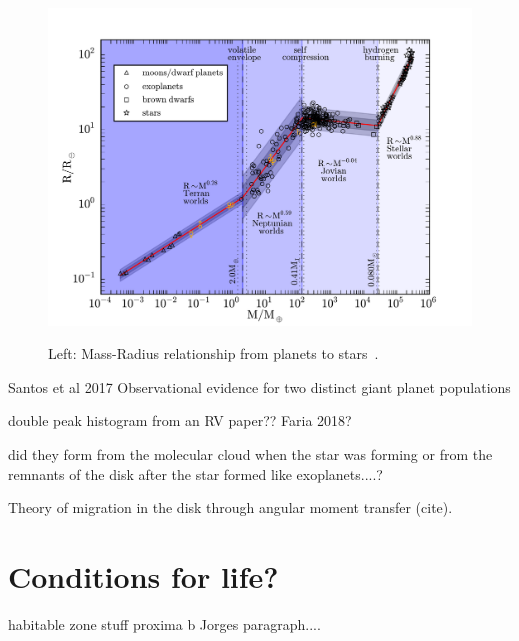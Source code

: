 \begin{figure}[t]
    \centering
    \includegraphics[width=0.9\linewidth]{./figures/introduction/mass_radius_relation.pdf}  \\
    \caption{Left: Mass-Radius relationship from planets to stars~\citet{chen_probabilistic_2016}.}
    \label{fig:mass_radius_relation}
\end{figure}


\citep{santos_observational_2017} Santos et al 2017   Observational evidence for two distinct giant planet populations
 

double peak histogram from an {RV} paper?? Faria 2018?


did they form from the molecular cloud when the star was forming or from the remnants of the disk after the star formed like exoplanets....?


Theory of migration in the disk through  angular moment transfer (cite).


\section{Conditions for life?}
habitable zone stuff
proxima b
Jorges paragraph....
